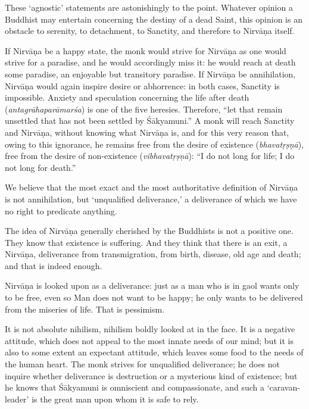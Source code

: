 \documentclass[a4paper, 11pt, oneside, english]{article}
\begin{document}
These `agnostic' statements are astonishingly to the point. Whatever opinion a Buddhist may entertain concerning the destiny of a dead Saint, this opinion is an obstacle to serenity, to detachment, to Sanctity, and therefore to Nirvāṇa itself.

If Nirvāṇa be a happy state, the monk would strive for Nirvāṇa as one would strive for a paradise, and he would accordingly miss it: he would reach at death some paradise, an enjoyable but transitory paradise. If Nirvāṇa be annihilation, Nirvāṇa would again inspire desire or abhorrence: in both cases, Sanctity is impossible. Anxiety and speculation concerning the life after death (\emph{antagrāhaparāmarśa}) is one of the five heresies. Therefore, ``let that remain unsettled that has not been settled by Śākyamuni.'' A monk will reach Sanctity and Nirvāṇa, without knowing what Nirvāṇa is, and for this very reason that, owing to this ignorance, he remains free from the desire of existence (\emph{bhavatṛṣṇā}), free from the desire of non-existence (\emph{vibhavatṛṣṇā}): ``I do not long for life; I do not long for death.''

We believe that the most exact and the most authoritative definition of Nirvāṇa is not annihilation, but `unqualified deliverance,' a deliverance of which we have no right to predicate anything.

The idea of Nirvāṇa generally cherished by the Buddhists is not a positive one. They know that existence is suffering. And they think that there is an exit, a Nirvāṇa, deliverance from transmigration, from birth, disease, old age and death; and that is indeed enough.

Nirvāṇa is looked upon as a deliverance: just as a man who is in gaol wants only to be free, even so Man does not want to be happy; he only wants to be delivered from the miseries of life. That is pessimism.

It is not absolute nihilism, nihilism boldly looked at in the face. It is a negative attitude, which does not appeal to the most innate needs of our mind; but it is also to some extent an expectant attitude, which leaves some food to the needs of the human heart. The monk strives for unqualified deliverance; he does not inquire whether deliverance is destruction or a mysterious kind of existence; but he knows that Śākyamuni is omniscient and compassionate, and such a `caravan-leader' is the great man upon whom it is safe to rely.

\subsection{}
\end{document}
